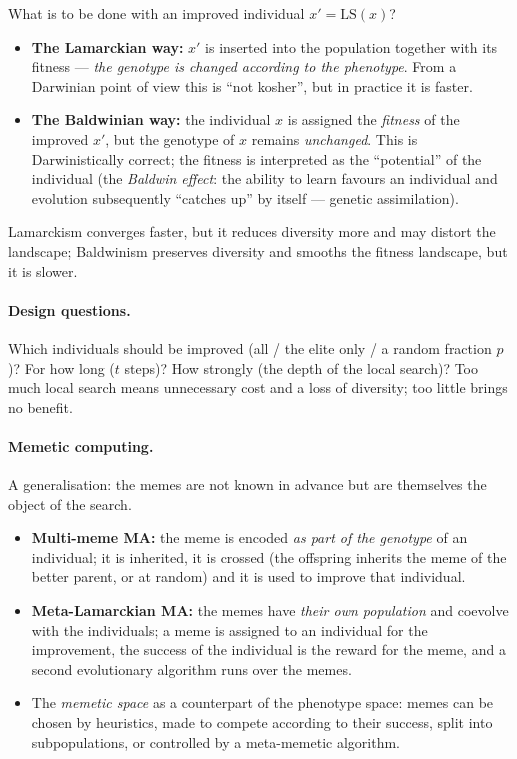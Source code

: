 \documentclass[11pt,a4paper]{article}
\theoremstyle{definition}
\providecommand{\uv}[1]{``#1''}
\begin{document}
\begin{defbox}
What is to be done with an improved individual $x' = \mathrm{LS}(x)$?
\begin{itemize}
\item \textbf{The Lamarckian way:} $x'$ is inserted into the population together
  with its fitness --- \emph{the genotype is changed according to the
  phenotype}. From a Darwinian point of view this is \uv{not kosher}, but in
  practice it is faster.
\item \textbf{The Baldwinian way:} the individual $x$ is assigned the
  \emph{fitness} of the improved $x'$, but the genotype of $x$ remains
  \emph{unchanged}. This is Darwinistically correct; the fitness is interpreted
  as the \uv{potential} of the individual (the \emph{Baldwin effect}: the
  ability to learn favours an individual and evolution subsequently
  \uv{catches up} by itself --- genetic assimilation).
\end{itemize}
Lamarckism converges faster, but it reduces diversity more and may distort the
landscape; Baldwinism preserves diversity and smooths the fitness landscape, but
it is slower.
\end{defbox}

\paragraph{Design questions.} Which individuals should be improved (all / the
elite only / a random fraction $p$)? For how long ($t$ steps)? How strongly (the
depth of the local search)? Too much local search means unnecessary cost and a
loss of diversity; too little brings no benefit.

\paragraph{Memetic computing.} A generalisation: the memes are not known in
advance but are themselves the object of the search.
\begin{itemize}
\item \textbf{Multi-meme MA:} the meme is encoded \emph{as part of the genotype}
  of an individual; it is inherited, it is crossed (the offspring inherits the
  meme of the better parent, or at random) and it is used to improve that
  individual.
\item \textbf{Meta-Lamarckian MA:} the memes have \emph{their own population}
  and coevolve with the individuals; a meme is assigned to an individual for the
  improvement, the success of the individual is the reward for the meme, and a
  second evolutionary algorithm runs over the memes.
\item The \emph{memetic space} as a counterpart of the phenotype space: memes
  can be chosen by heuristics, made to compete according to their success, split
  into subpopulations, or controlled by a meta-memetic algorithm.
\end{itemize}
\end{document}
